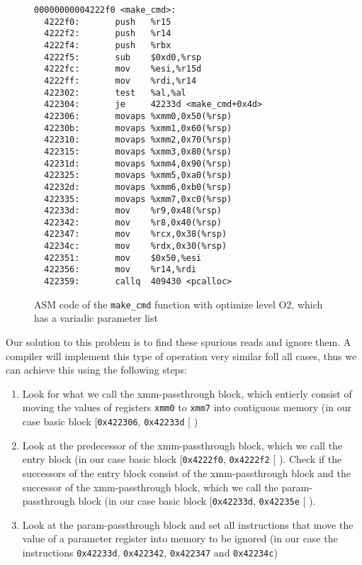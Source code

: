 \begin{figure}
\centering\begin{BVerbatim}
00000000004222f0 <make_cmd>:
  4222f0:       push   %
  4222f2:       push   %
  4222f4:       push   %
  4222f5:       sub    $0xd0,%
  4222fc:       mov    %
  4222ff:       mov    %
  422302:       test   %
  422304:       je     42233d <make_cmd+0x4d>
  422306:       movaps %
  42230b:       movaps %
  422310:       movaps %
  422315:       movaps %
  42231d:       movaps %
  422325:       movaps %
  42232d:       movaps %
  422335:       movaps %
  42233d:       mov    %
  422342:       mov    %
  422347:       mov    %
  42234c:       mov    %
  422351:       mov    $0x50,%
  422356:       mov    %
  422359:       callq  409430 <pcalloc>
\end{BVerbatim}
\caption{ASM code of the \texttt{make\_cmd} function with optimize level O2, which has a variadic parameter list}
\label{fig:asmvariadic}
\end{figure}

Our solution to this problem is to find these spurious reads and ignore them. A compiler will implement this type of operation very similar foll all cases, thus we can achieve this using the following steps:
\begin{enumerate}
\item Look for what we call the xmm-passthrough block, which entierly consist of moving the values of registers \texttt{xmm0} to \texttt{xmm7} into contiguous memory (in our case basic block [\texttt{0x422306}, \texttt{0x42233d} [ )

\item Look at the predecessor of the xmm-passthrough block, which we call the entry block (in our case basic block [\texttt{0x4222f0}, \texttt{0x4222f2} [ ). Check if the successors of the entry block consist of the xmm-passthrough block and the successor of the xmm-passthrough block, which we call the param-passthrough block (in our case basic block [\texttt{0x42233d}, \texttt{0x42235e} [ ).
\item Look at the param-passthrough block and set all instructions that move the value of a parameter register into memory to be ignored (in our case the instructions \texttt{0x42233d}, \texttt{0x422342}, \texttt{0x422347} and \texttt{0x42234c})
\end{enumerate}


